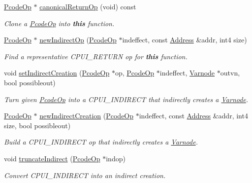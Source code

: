 \begin{DoxyCompactItemize}
\mbox{\hyperlink{class_pcode_op}{Pcode\+Op}} $\ast$ \mbox{\hyperlink{class_funcdata_a2e96275c93ab53257f8b56d6ee9737bb}{canonical\+Return\+Op}} (void) const
\begin{DoxyCompactList}\small\item\em Clone a \mbox{\hyperlink{class_pcode_op}{Pcode\+Op}} into {\bfseries{this}} function. \end{DoxyCompactList}\item 
\mbox{\hyperlink{class_pcode_op}{Pcode\+Op}} $\ast$ \mbox{\hyperlink{class_funcdata_ae12a353a87a208c1a39442571990fb9f}{new\+Indirect\+Op}} (\mbox{\hyperlink{class_pcode_op}{Pcode\+Op}} $\ast$indeffect, const \mbox{\hyperlink{class_address}{Address}} \&addr, int4 size)
\begin{DoxyCompactList}\small\item\em Find a representative C\+P\+U\+I\+\_\+\+R\+E\+T\+U\+RN op for {\bfseries{this}} function. \end{DoxyCompactList}\item 
void \mbox{\hyperlink{class_funcdata_a1ffffe235b79fb8b9bc955d93ad0b18a}{set\+Indirect\+Creation}} (\mbox{\hyperlink{class_pcode_op}{Pcode\+Op}} $\ast$op, \mbox{\hyperlink{class_pcode_op}{Pcode\+Op}} $\ast$indeffect, \mbox{\hyperlink{class_varnode}{Varnode}} $\ast$outvn, bool possibleout)
\begin{DoxyCompactList}\small\item\em Turn given \mbox{\hyperlink{class_pcode_op}{Pcode\+Op}} into a C\+P\+U\+I\+\_\+\+I\+N\+D\+I\+R\+E\+CT that {\itshape indirectly} {\itshape creates} a \mbox{\hyperlink{class_varnode}{Varnode}}. \end{DoxyCompactList}\item 
\mbox{\hyperlink{class_pcode_op}{Pcode\+Op}} $\ast$ \mbox{\hyperlink{class_funcdata_add1098b768d9a176cf59e4f4c9e27cb5}{new\+Indirect\+Creation}} (\mbox{\hyperlink{class_pcode_op}{Pcode\+Op}} $\ast$indeffect, const \mbox{\hyperlink{class_address}{Address}} \&addr, int4 size, bool possibleout)
\begin{DoxyCompactList}\small\item\em Build a C\+P\+U\+I\+\_\+\+I\+N\+D\+I\+R\+E\+CT op that {\itshape indirectly} {\itshape creates} a \mbox{\hyperlink{class_varnode}{Varnode}}. \end{DoxyCompactList}\item 
void \mbox{\hyperlink{class_funcdata_a964a7c66123c0b8ed931cf131521ecdf}{truncate\+Indirect}} (\mbox{\hyperlink{class_pcode_op}{Pcode\+Op}} $\ast$indop)
\begin{DoxyCompactList}\small\item\em Convert C\+P\+U\+I\+\_\+\+I\+N\+D\+I\+R\+E\+CT into an {\itshape indirect} {\itshape creation}. \end{DoxyCompactList}\item 

\end{DoxyCompactItemize}
